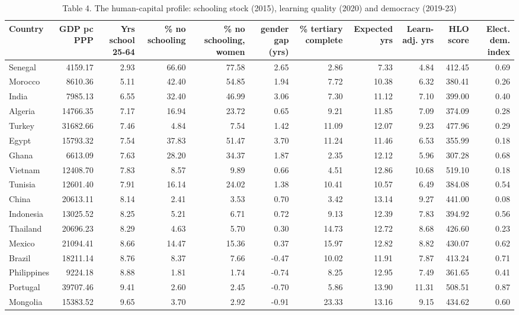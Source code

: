 \begin{table}
\caption{Table 4. The human-capital profile: schooling stock (2015), learning quality (2020) and democracy (2019-23)}
\label{tab:T4_education_profile}
\begin{tabular}{lrrrrrrrrrr}
\toprule
Country & GDP pc PPP & Yrs school 25-64 & \% no schooling & \% no schooling, women & gender gap (yrs) & \% tertiary complete & Expected yrs & Learn-adj. yrs & HLO score & Elect. dem. index \\
\midrule
Senegal & 4159.17 & 2.93 & 66.60 & 77.58 & 2.65 & 2.86 & 7.33 & 4.84 & 412.45 & 0.69 \\
Morocco & 8610.36 & 5.11 & 42.40 & 54.85 & 1.94 & 7.72 & 10.38 & 6.32 & 380.41 & 0.26 \\
India & 7985.13 & 6.55 & 32.40 & 46.99 & 3.06 & 7.30 & 11.12 & 7.10 & 399.00 & 0.40 \\
Algeria & 14766.35 & 7.17 & 16.94 & 23.72 & 0.65 & 9.21 & 11.85 & 7.09 & 374.09 & 0.28 \\
Turkey & 31682.66 & 7.46 & 4.84 & 7.54 & 1.42 & 11.09 & 12.07 & 9.23 & 477.96 & 0.29 \\
Egypt & 15793.32 & 7.54 & 37.83 & 51.47 & 3.70 & 11.24 & 11.46 & 6.53 & 355.99 & 0.18 \\
Ghana & 6613.09 & 7.63 & 28.20 & 34.37 & 1.87 & 2.35 & 12.12 & 5.96 & 307.28 & 0.68 \\
Vietnam & 12408.70 & 7.83 & 8.57 & 9.89 & 0.66 & 4.51 & 12.86 & 10.68 & 519.10 & 0.18 \\
Tunisia & 12601.40 & 7.91 & 16.14 & 24.02 & 1.38 & 10.41 & 10.57 & 6.49 & 384.08 & 0.54 \\
China & 20613.11 & 8.14 & 2.41 & 3.53 & 0.70 & 3.42 & 13.14 & 9.27 & 441.00 & 0.08 \\
Indonesia & 13025.52 & 8.25 & 5.21 & 6.71 & 0.72 & 9.13 & 12.39 & 7.83 & 394.92 & 0.56 \\
Thailand & 20696.23 & 8.29 & 4.63 & 5.70 & 0.30 & 14.73 & 12.72 & 8.68 & 426.60 & 0.23 \\
Mexico & 21094.41 & 8.66 & 14.47 & 15.36 & 0.37 & 15.97 & 12.82 & 8.82 & 430.07 & 0.62 \\
Brazil & 18211.14 & 8.76 & 8.37 & 7.66 & -0.47 & 10.02 & 11.91 & 7.87 & 413.24 & 0.71 \\
Philippines & 9224.18 & 8.88 & 1.81 & 1.74 & -0.74 & 8.25 & 12.95 & 7.49 & 361.65 & 0.41 \\
Portugal & 39707.46 & 9.41 & 2.60 & 2.45 & -0.70 & 5.86 & 13.90 & 11.31 & 508.51 & 0.87 \\
Mongolia & 15383.52 & 9.65 & 3.70 & 2.92 & -0.91 & 23.33 & 13.16 & 9.15 & 434.62 & 0.60 \\

\end{tabular}
\end{table}
